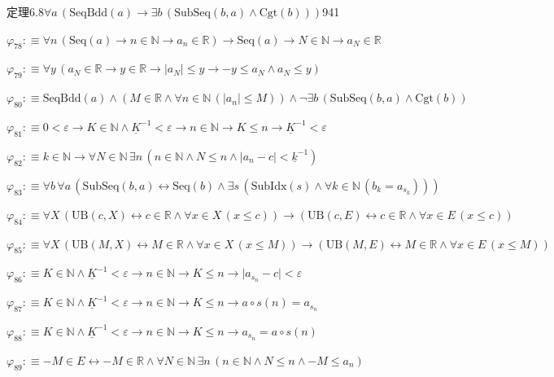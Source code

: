\begin{fullproof}{定理6.8}{$\forall a\,(\mathrm{SeqBdd}(a) \to \exists b\,(\mathrm{SubSeq}(b,a) \land \mathrm{Cgt}(b)))$}{941}
\begin{abbrevlist}
\item $\varphi_{78} :\equiv \forall n\,(\mathrm{Seq}(a) \to n \in \mathbb{N} \to a_{n} \in \mathbb{R}) \to \mathrm{Seq}(a) \to N \in \mathbb{N} \to a_{N} \in \mathbb{R}$
\item $\varphi_{79} :\equiv \forall y\,(a_{N} \in \mathbb{R} \to y \in \mathbb{R} \to \lvert a_{N} \rvert \leq y \to -y \leq a_{N} \land a_{N} \leq y)$
\item $\varphi_{80} :\equiv \mathrm{SeqBdd}(a) \land (M \in \mathbb{R} \land \forall n \in \mathbb{N}\,(\lvert a_{n} \rvert \leq M)) \land \neg \exists b\,(\mathrm{SubSeq}(b,a) \land \mathrm{Cgt}(b))$
\item $\varphi_{81} :\equiv 0 < \varepsilon \to K \in \mathbb{N} \land \underline{K}^{-1} < \varepsilon \to n \in \mathbb{N} \to K \leq n \to \underline{K}^{-1} < \varepsilon$
\item $\varphi_{82} :\equiv k \in \mathbb{N} \to \forall N \in \mathbb{N}\,\exists n\,(n \in \mathbb{N} \land N \leq n \land \lvert a_{n} - c \rvert < \underline{k}^{-1})$
\item $\varphi_{83} :\equiv \forall b\,\forall a\,(\mathrm{SubSeq}(b,a) \leftrightarrow \mathrm{Seq}(b) \land \exists s\,(\mathrm{SubIdx}(s) \land \forall k \in \mathbb{N}\,(b_{k} = a_{s_{k}})))$
\item $\varphi_{84} :\equiv \forall X\,(\mathrm{UB}(c,X) \leftrightarrow c \in \mathbb{R} \land \forall x \in X\,(x \leq c)) \to (\mathrm{UB}(c,E) \leftrightarrow c \in \mathbb{R} \land \forall x \in E\,(x \leq c))$
\item $\varphi_{85} :\equiv \forall X\,(\mathrm{UB}(M,X) \leftrightarrow M \in \mathbb{R} \land \forall x \in X\,(x \leq M)) \to (\mathrm{UB}(M,E) \leftrightarrow M \in \mathbb{R} \land \forall x \in E\,(x \leq M))$
\item $\varphi_{86} :\equiv K \in \mathbb{N} \land \underline{K}^{-1} < \varepsilon \to n \in \mathbb{N} \to K \leq n \to \lvert a_{s_{n}} - c \rvert < \varepsilon$
\item $\varphi_{87} :\equiv K \in \mathbb{N} \land \underline{K}^{-1} < \varepsilon \to n \in \mathbb{N} \to K \leq n \to a \circ s(n) = a_{s_{n}}$
\item $\varphi_{88} :\equiv K \in \mathbb{N} \land \underline{K}^{-1} < \varepsilon \to n \in \mathbb{N} \to K \leq n \to a_{s_{n}} = a \circ s(n)$
\item $\varphi_{89} :\equiv -M \in E \leftrightarrow -M \in \mathbb{R} \land \forall N \in \mathbb{N}\,\exists n\,(n \in \mathbb{N} \land N \leq n \land -M \leq a_{n})$

\end{abbrevlist}
\end{fullproof}
